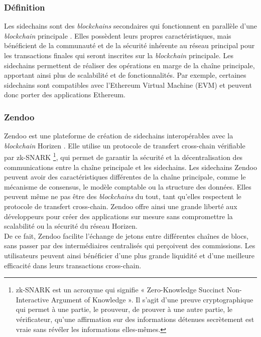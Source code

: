 \subsubsection{Définition}
Les \gls{sidechain}s sont des \textit{\gls{blockchain}s} secondaires qui fonctionnent en parallèle d'une \textit{\gls{blockchain}} principale \cite{jensen2021introduction,qin2018overview,belchior2022survey}. Elles possèdent leurs propres 
caractéristiques, mais bénéficient de la communauté et de la sécurité inhérente au réseau principal pour les transactions finales qui seront inscrites sur 
la \textit{\gls{blockchain}} principale. Les sidechains permettent de réaliser des opérations en marge de la chaîne principale, apportant ainsi plus de scalabilité 
et de fonctionnalités. Par exemple, certaines \gls{sidechain}s sont compatibles avec l'\gls{Ethereum} Virtual Machine (EVM) et peuvent donc porter des applications \gls{Ethereum}.

\subsubsection{Zendoo}
Zendoo est une plateforme de création de \gls{sidechain}s interopérables avec la \textit{\gls{blockchain}} Horizen \cite{garoffolo2020zendoo,belchior2022survey}. Elle utilise un protocole 
de transfert cross-chain vérifiable par zk-SNARK \footnote{zk-SNARK est un acronyme qui signifie « Zero-Knowledge Succinct Non-Interactive Argument of Knowledge ». 
Il s'agit d'une preuve cryptographique qui permet à une partie, le prouveur, de prouver à une autre partie, le vérificateur, qu'une affirmation sur des informations 
détenues secrètement est vraie sans révéler les informations elles-mêmes.}, qui permet de garantir la sécurité et la décentralisation des communications entre 
la chaîne principale et les sidechains. Les sidechains Zendoo peuvent avoir des caractéristiques différentes de la chaîne principale, comme le mécanisme de 
consensus, le modèle comptable ou la structure des données. Elles peuvent même ne pas être des \textit{\gls{blockchain}s} du tout, tant qu'elles respectent le protocole 
de transfert cross-chain. Zendoo offre ainsi une grande liberté aux développeurs pour créer des applications sur mesure sans compromettre la scalabilité ou la 
sécurité du réseau Horizen.\\
De ce fait, Zendoo facilite l'échange de jetons entre différentes chaînes de blocs, sans passer par des intermédiaires centralisés qui perçoivent des commissions. 
Les utilisateurs peuvent ainsi bénéficier d'une plus grande liquidité et d'une meilleure efficacité dans leurs transactions cross-chain.

